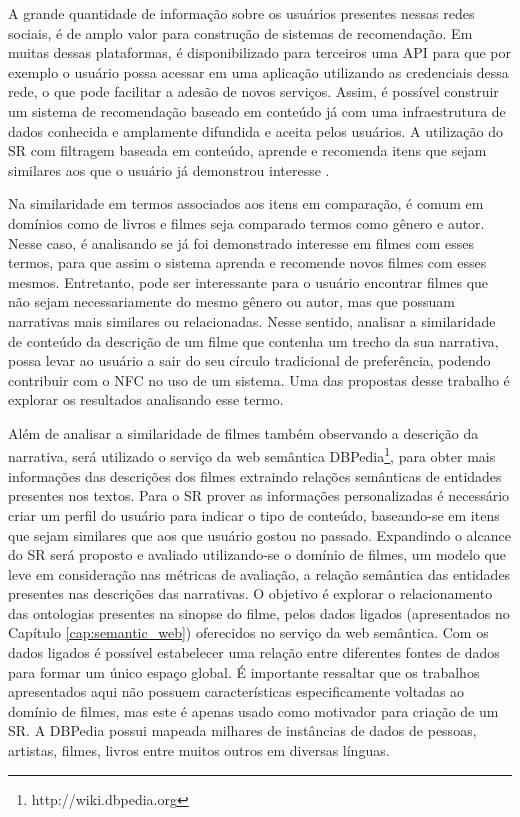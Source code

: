 A grande quantidade de informação sobre os usuários presentes nessas redes sociais, é de amplo valor para construção de sistemas de recomendação. Em muitas dessas plataformas, é disponibilizado para terceiros uma API para que por exemplo o usuário possa acessar em uma aplicação utilizando as credenciais dessa rede, o que pode facilitar a adesão de novos serviços. Assim, é possível construir um sistema de recomendação baseado em conteúdo já com uma infraestrutura de dados conhecida e amplamente difundida e aceita pelos usuários. A utilização do SR com filtragem baseada em conteúdo, aprende e recomenda itens que sejam similares aos que o usuário já demonstrou interesse \citep{Ricci2011}.

Na similaridade em termos associados aos itens em comparação, é comum em domínios como de livros e filmes seja comparado termos como gênero e autor. Nesse caso, é analisando se já foi demonstrado interesse em filmes com esses termos, para que assim o sistema aprenda e recomende novos filmes com esses mesmos. Entretanto, pode ser interessante para o usuário encontrar filmes que não sejam necessariamente do mesmo gênero ou autor, mas que possuam narrativas mais similares ou relacionadas. Nesse sentido, analisar a similaridade de conteúdo da descrição de um filme que contenha um trecho da sua narrativa, possa levar ao usuário a sair do seu círculo tradicional de preferência, podendo contribuir com o NFC no uso de um sistema. Uma das propostas desse trabalho é explorar os resultados analisando esse termo.

Além de analisar a similaridade de filmes também observando a descrição da narrativa, será utilizado o serviço da web semântica DBPedia\footnote{http://wiki.dbpedia.org}, para obter mais informações das descrições dos filmes extraindo relações semânticas de entidades presentes nos textos. Para o SR prover as informações personalizadas é necessário criar um perfil do usuário para indicar o tipo de conteúdo, baseando-se em itens que sejam similares que aos que usuário gostou no passado. Expandindo o alcance do SR será proposto e avaliado utilizando-se o domínio de filmes, um modelo que leve em consideração nas métricas de avaliação, a relação semântica das entidades presentes nas descrições das narrativas. O objetivo é explorar o relacionamento das ontologias presentes na sinopse do filme, pelos dados ligados (apresentados no Capítulo \ref{cap:semantic_web}) oferecidos no serviço da web semântica. Com os dados ligados é possível estabelecer uma relação entre diferentes fontes de dados para formar um único espaço global. É importante ressaltar que os trabalhos apresentados aqui não possuem características especificamente voltadas ao domínio de filmes, mas este é apenas usado como motivador para criação de um SR. A DBPedia possui mapeada milhares de instâncias de dados de pessoas, artistas, filmes, livros entre muitos outros em diversas línguas.

